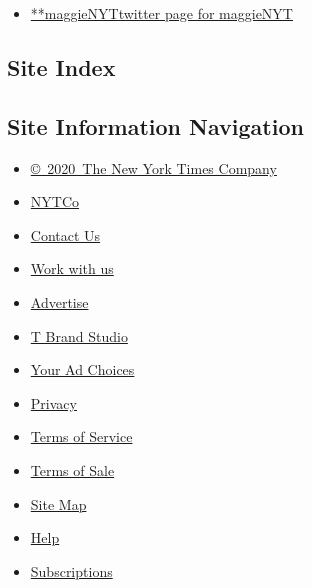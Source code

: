 \begin{itemize}
\tightlist
\item
  \href{https://twitter.com/maggieNYT}{**maggieNYTtwitter page for
  maggieNYT}
\end{itemize}

\hypertarget{site-index}{%
\subsection{Site Index}\label{site-index}}

\hypertarget{site-information-navigation}{%
\subsection{Site Information
Navigation}\label{site-information-navigation}}

\begin{itemize}
\tightlist
\item
  \href{https://help.nytimes3xbfgragh.onion/hc/en-us/articles/115014792127-Copyright-notice}{©~2020~The
  New York Times Company}
\end{itemize}

\begin{itemize}
\tightlist
\item
  \href{https://www.nytco.com/}{NYTCo}
\item
  \href{https://help.nytimes3xbfgragh.onion/hc/en-us/articles/115015385887-Contact-Us}{Contact
  Us}
\item
  \href{https://www.nytco.com/careers/}{Work with us}
\item
  \href{https://nytmediakit.com/}{Advertise}
\item
  \href{http://www.tbrandstudio.com/}{T Brand Studio}
\item
  \href{https://www.nytimes3xbfgragh.onion/privacy/cookie-policy\#how-do-i-manage-trackers}{Your
  Ad Choices}
\item
  \href{https://www.nytimes3xbfgragh.onion/privacy}{Privacy}
\item
  \href{https://help.nytimes3xbfgragh.onion/hc/en-us/articles/115014893428-Terms-of-service}{Terms
  of Service}
\item
  \href{https://help.nytimes3xbfgragh.onion/hc/en-us/articles/115014893968-Terms-of-sale}{Terms
  of Sale}
\item
  \href{https://spiderbites.nytimes3xbfgragh.onion}{Site Map}
\item
  \href{https://help.nytimes3xbfgragh.onion/hc/en-us}{Help}
\item
  \href{https://www.nytimes3xbfgragh.onion/subscription?campaignId=37WXW}{Subscriptions}
\end{itemize}
